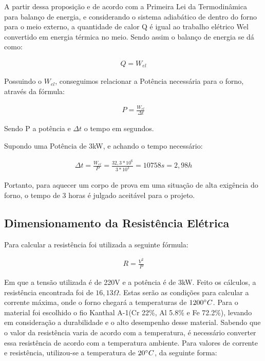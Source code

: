 A partir dessa proposição e de acordo com a Primeira Lei da Termodinâmica para balanço de energia, e considerando o sistema adiabático de dentro do forno para o meio externo, a quantidade de calor Q é igual ao trabalho elétrico Wel convertido em energia térmica no meio. Sendo assim o balanço de energia se dá como:

\begin{gather}
    Q = W_{el}
\end{gather}

Possuindo o $W_{el}$, conseguimos relacionar a Potência necessária para o forno, através da fórmula:

\begin{gather}
    P = \frac{W_{el}}{\Delta t}
\end{gather}

Sendo P a potência e $\Delta t$ o tempo em segundos.

Supondo uma Potência de 3kW, e achando o tempo necessário:

\begin{gather}
    \Delta t = \frac{W_{el}}{P} = \frac{32,3*10^6}{3*10^3} = 10758s = 2,98h \nonumber
\end{gather}

Portanto, para aquecer um corpo de prova em uma situação de alta exigência do forno, o tempo de 3 horas é julgado aceitável para o projeto.

\subsection{Dimensionamento da Resistência Elétrica}

Para calcular a resistência foi utilizada a seguinte fórmula:

\begin{gather}
    R = \frac{V^2}{P}
\end{gather}

Em que a tensão utilizada é de 220V e a potência é de 3kW. Feito os cálculos, a resistência encontrada foi de $16,13 \Omega$. Estas serão as condições para calcular a corrente máxima, onde o forno chegará a temperaturas de $1200 \degree C$. Para o material foi escolhido o fio Kanthal A-1(Cr 22\%, Al 5.8\% e Fe 72.2\%), levando em consideração a durabilidade e o alto desempenho desse material. Sabendo que o valor da resistência varia de acordo com a temperatura, é necessário converter essa resistência de acordo com a temperatura ambiente. Para valores de corrente e resistência, utilizou-se a temperatura de $20 \degree C$, da seguinte forma:

